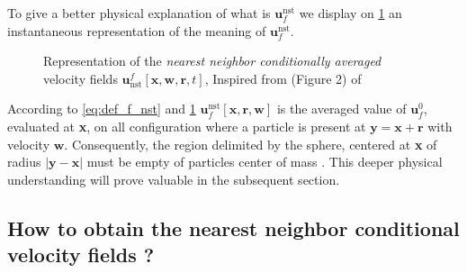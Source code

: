 To give a better physical explanation of what is $\textbf{u}_f^\text{nst}$ we display on \ref{fig:unst} an instantaneous representation of the meaning of $\textbf{u}_f^\text{nst}$. 
\begin{figure}[h!]
    \centering
{} 
\caption{Representation of the \textit{nearest neighbor conditionally averaged} velocity fields $\textbf{u}_\text{nst}^f[\textbf{x},\textbf{w},\textbf{r},t]$, Inspired from (Figure 2) of \citet{zhang2021ensemble}}
\label{fig:unst}
\end{figure}
According to \ref{eq:def_f_nst} and \ref{fig:unst} $\textbf{u}_f^\text{nst}[\textbf{x},\textbf{r},\textbf{w}]$ is the averaged value of $\textbf{u}_f^0$, evaluated at \textbf{x}, on all configuration where a particle is present at $\textbf{y} = \textbf{x} + \textbf{r}$ with velocity $\textbf{w}$. 
Consequently, the region delimited by the sphere, centered at \textbf{x} of radius $|\textbf{y} - \textbf{x}|$ must be empty of particles center of mass \citep{zhang2021ensemble}. 
This deeper physical understanding will prove valuable in the subsequent section.  



\subsection{How to obtain the nearest neighbor conditional velocity fields ?}

